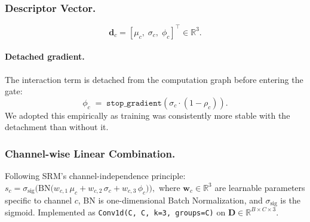 \documentclass{bmvc2k}
\begin{document}
\subsubsection{Descriptor Vector.}
\begin{equation}\label{eq:desc}
    \mathbf{d}_c = [\mu_c,\; \sigma_c,\; \phi_c]^\top \in \mathbb{R}^3.
\end{equation}

\paragraph{Detached gradient.} The interaction term is detached from the computation graph before entering the gate:
\begin{equation}
\phi_c \;=\; \texttt{stop\_gradient}\!\left(\sigma_c \cdot (1-\rho_c)\right).
\label{eq:detach}
\end{equation}
We adopted this empirically as training was consistently more stable with the detachment than without it.

\subsubsection{Channel-wise Linear Combination.}

Following SRM's channel-independence principle:
$ s_c = \sigma_{\text{sig}}\!\Big(\mathrm{BN}\big(w_{c,1}\,\mu_c + w_{c,2}\,\sigma_c + w_{c,3}\,\phi_c\big)\Big),$ where $\mathbf{w}_c \in \mathbb{R}^3$ are learnable parameters specific to channel $c$, BN is one-dimensional Batch Normalization, and $\sigma_{\text{sig}}$ is the sigmoid. Implemented as \texttt{Conv1d(C, C, k=3, groups=C)} 
on $\mathbf{D} \in \mathbb{R}^{B \times C \times 3}$.

\vspace{-2.0\baselineskip}
\end{document}
